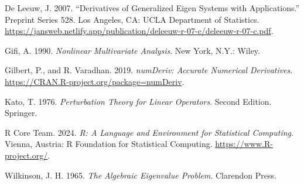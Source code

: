 \documentclass[
  12pt,
  letterpaper,
  DIV=11,
  numbers=noendperiod]{scrartcl}
\newlength{\cslhangindent}
\newenvironment{CSLReferences}[2] %
 {\begin{list}{}{%
  \setlength{\itemindent}{0pt}
  \setlength{\leftmargin}{0pt}
  \setlength{\parsep}{0pt}
  \ifodd #1
   \setlength{\leftmargin}{\cslhangindent}
   \setlength{\itemindent}{-1\cslhangindent}
  \fi
  \setlength{\itemsep}{#2\baselineskip}}}
 {\end{list}}
\begin{document}
\label{refs}
\begin{CSLReferences}{1}{0}
De Leeuw, J. 2007. {``Derivatives of Generalized Eigen Systems with
Applications.''} Preprint Series 528. Los Angeles, CA: UCLA Department
of Statistics.
\url{https://jansweb.netlify.app/publication/deleeuw-r-07-c/deleeuw-r-07-c.pdf}.

Gifi, A. 1990. \emph{Nonlinear Multivariate Analysis}. New York, N.Y.:
Wiley.

Gilbert, P., and R. Varadhan. 2019. \emph{{numDeriv: Accurate Numerical
Derivatives}}. \url{https://CRAN.R-project.org/package=numDeriv}.

Kato, T. 1976. \emph{Perturbation Theory for Linear Operators}. Second
Edition. Springer.

R Core Team. 2024. \emph{R: A Language and Environment for Statistical
Computing}. {Vienna, Austria}: R Foundation for Statistical Computing.
\url{https://www.R-project.org/}.

Wilkinson, J. H. 1965. \emph{{The Algebraic Eigenvalue Problem}}.
Clarendon Press.

\end{CSLReferences}
\end{document}
